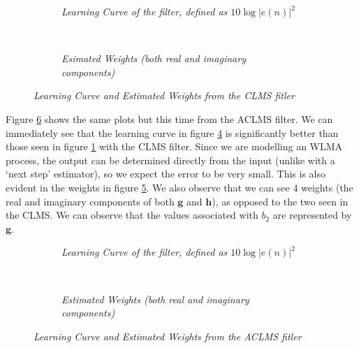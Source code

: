 \documentclass[./main.tex]{subfiles}
\begin{document}
\begin{figure}[h]
	\centering
	\begin{subfigure}[b]{0.49\textwidth}
		\resizebox{\textwidth}{!}{}
		\caption{\textit{Learning Curve of the filter, defined as $ 10 \log|e(n)|^2 $}}
		\label{fig:4_1_a_clms_err}
	\end{subfigure}
	~ %
	\begin{subfigure}[b]{0.49\textwidth}
	 \resizebox{\textwidth}{!}{}
		\caption{\textit{Esimated Weights (both real and imaginary components)}}
		\label{fig:4_1_a_clms_weights}
	\end{subfigure}
	\caption{\textit{Learning Curve and Estimated Weights from the CLMS fitler}}
\end{figure}

Figure \ref{fig:4_1_a_aclms} shows the same plots but this time from the ACLMS filter. We can immediately see that the learning curve in figure \ref{fig:4_1_a_aclms_err} is significantly better than those seen in figure \ref{fig:4_1_a_clms_err} with the CLMS filter. Since we are modelling an WLMA process, the output can be determined directly from the input (unlike with a `next step' estimator), so we expect the error to be very small. This is also evident in the weights in figure \ref{fig:4_1_a_aclms_weights}. We also observe that we can see 4 weights (the real and imaginary components of both $ \mathbf{g}$ and $ \mathbf{h}$), as opposed to the two seen in the CLMS. We can observe that the values associated with $ b_2 $ are represented by $ \mathbf{g} $.

\begin{figure}[h]
	\centering
	\begin{subfigure}[b]{0.49\textwidth}
		\resizebox{\textwidth}{!}{}
		\caption{\textit{Learning Curve of the filter, defined as $ 10 \log|e(n)|^2 $}}
		\label{fig:4_1_a_aclms_err}
	\end{subfigure}
	~ %
	\begin{subfigure}[b]{0.49\textwidth}
		\resizebox{\textwidth}{!}{}
		\caption{\textit{Estimated Weights (both real and imaginary components)}}
		\label{fig:4_1_a_aclms_weights}
	\end{subfigure}
	\caption{\textit{Learning Curve and Estimated Weights from the ACLMS fitler}}
	\label{fig:4_1_a_aclms}
\end{figure}
\end{document}
